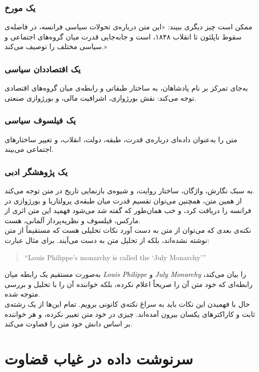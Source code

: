 \subsubsection{یک مورخ}
ممکن است چیز دیگری ببیند: «این متن درباره‌ی تحولات سیاسی فرانسه، در فاصله‌ی سقوط ناپلئون تا انقلاب ۱۸۴۸، است و جابه‌جایی قدرت میان گروه‌های اجتماعی و سیاسی مختلف را توصیف می‌کند.»

\subsubsection{یک اقتصاددان سیاسی}
به‌جای تمرکز بر نام پادشاهان، به ساختار طبقاتی و رابطه‌ی میان گروه‌های اقتصادی توجه می‌کند: نقش بورژوازی، اشرافیت مالی، و بورژوازی صنعتی.

\subsubsection{یک فیلسوف سیاسی}
متن را به‌عنوان داده‌ای درباره‌ی قدرت، طبقه، دولت، انقلاب، و تغییر ساختارهای اجتماعی می‌بیند.

\subsubsection{یک پژوهشگر ادبی}
به سبک نگارش، واژگان، ساختار روایت، و شیوه‌ی بازنمایی تاریخ در متن توجه می‌کند.\\
از همین متن، همچنین می‌توان تقسیم قدرت میان طبقه‌ی پرولتاریا و بورژوازی در فرانسه را دریافت کرد، و خب همان‌طور که گفته شد می‌شود فهمید این متن اثری از مارکس، فیلسوف و نظریه‌پرداز آلمانی، هست.\\
نکته‌ی بعدی که می‌توان از متن به دست آورد نکات تحلیلی هست که مستقیماً از متن نوشته نشده‌اند، بلکه از تحلیل متن به دست می‌آیند. برای مثال عبارت:

\begin{latin}
\begin{quote}
``Louis Philippe's monarchy is called the `July Monarchy'''
\end{quote}
\end{latin}
به‌صورت مستقیم یک رابطه میان \textit{Louis Philippe} و \textit{July Monarchy} را بیان می‌کند، رابطه‌ای که خود متن آن را صریحاً اعلام نکرده، بلکه خواننده آن را با تحلیل و بررسی متوجه شده.\\
حال با فهمیدن این نکات باید به سراغ نکته‌ی کانونی برویم. تمام این‌ها از یک رشته‌ی ثابت و کاراکترهای یکسان بیرون آمده‌اند. چیزی در خود متن تغییر نکرده، و هر خواننده بر اساس دانش خود متن را قضاوت می‌کند.
\newpage
\section{سرنوشت داده در غیاب قضاوت}
\label{sec:fate-of-data-without-judgment}

